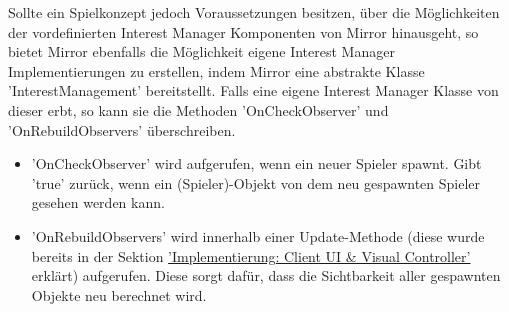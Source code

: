 Sollte ein Spielkonzept jedoch Voraussetzungen besitzen, über die Möglichkeiten der vordefinierten Interest Manager Komponenten von Mirror hinausgeht, so bietet Mirror ebenfalls die Möglichkeit eigene Interest Manager Implementierungen zu erstellen, indem Mirror eine abstrakte Klasse 'InterestManagement' bereitstellt. Falls eine eigene Interest Manager Klasse von dieser erbt, so kann sie die Methoden 'OnCheckObserver' und 'OnRebuildObservers' überschreiben. \cite{.17.02.2022c}

\begin{itemize}
	\item 'OnCheckObserver' wird aufgerufen, wenn ein neuer Spieler spawnt. Gibt 'true' zurück, wenn ein (Spieler)-Objekt von dem neu gespawnten Spieler gesehen werden kann.
	\item 'OnRebuildObservers' wird innerhalb einer Update-Methode (diese wurde bereits in der Sektion \hyperref[implementierung:client_UI_Controller]{'Implementierung: Client UI \& Visual Controller'} erklärt) aufgerufen. Diese sorgt dafür, dass die Sichtbarkeit aller gespawnten Objekte neu berechnet wird.
\end{itemize}